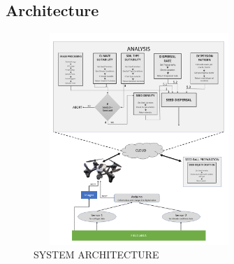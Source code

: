 \documentclass[conference]{IEEEtran}
\begin{document}
\subsection{Architecture}

\begin{figure}[htp]
    \centering
    \includegraphics[width=8cm,height=8cm]{architecture_ml.png}
    \caption{SYSTEM ARCHITECTURE}
    \label{sa}
\end{figure}
\end{document}
